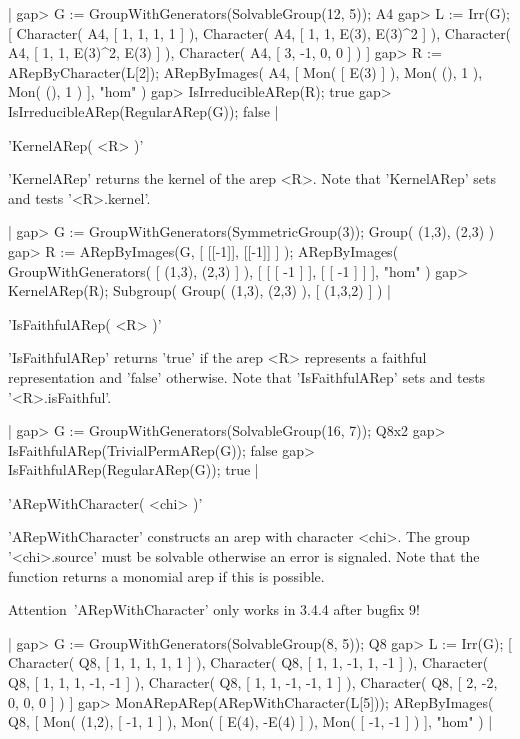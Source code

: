 |    gap> G := GroupWithGenerators(SolvableGroup(12, 5));
    A4
    gap> L := Irr(G);
    [ Character( A4, [ 1, 1, 1, 1 ] ), 
      Character( A4, [ 1, 1, E(3), E(3)^2 ] ), 
      Character( A4, [ 1, 1, E(3)^2, E(3) ] ), 
      Character( A4, [ 3, -1, 0, 0 ] ) ]
    gap> R := ARepByCharacter(L[2]);
    ARepByImages(
      A4,
      [ Mon( [ E(3) ] ),
        Mon( (), 1 ),
        Mon( (), 1 )
      ],
      "hom"
    )
    gap> IsIrreducibleARep(R);
    true 
    gap> IsIrreducibleARep(RegularARep(G));
    false |


'KernelARep( <R> )'

'KernelARep' returns the kernel of the arep <R>.
Note that 'KernelARep' sets and tests '<R>.kernel'.

|    gap> G := GroupWithGenerators(SymmetricGroup(3));
    Group( (1,3), (2,3) )
    gap> R := ARepByImages(G, [ [[-1]], [[-1]] ] );
    ARepByImages(
      GroupWithGenerators( [ (1,3), (2,3) ] ),
      [ [ [ -1 ] ],
        [ [ -1 ] ]
      ],
      "hom"
    )
    gap> KernelARep(R);
    Subgroup( Group( (1,3), (2,3) ), [ (1,3,2) ] ) |


'IsFaithfulARep( <R> )'

'IsFaithfulARep' returns 'true' if the arep <R> represents a faithful 
representation and 'false' otherwise.
Note that 'IsFaithfulARep' sets and tests '<R>.isFaithful'.

|    gap> G := GroupWithGenerators(SolvableGroup(16, 7));
    Q8x2
    gap> IsFaithfulARep(TrivialPermARep(G));
    false
    gap> IsFaithfulARep(RegularARep(G));
    true |


'ARepWithCharacter( <chi> )'

'ARepWithCharacter' constructs an arep with character <chi>. 
The group '<chi>.source' must be solvable otherwise an error is
signaled. Note that the function returns a monomial arep 
if this is possible.

Attention\:\ 'ARepWithCharacter' only works in {\GAP} 3.4.4 after
bugfix 9!

|    gap> G := GroupWithGenerators(SolvableGroup(8, 5));
    Q8
    gap> L := Irr(G);
    [ Character( Q8, [ 1, 1, 1, 1, 1 ] ), 
      Character( Q8, [ 1, 1, -1, 1, -1 ] ), 
      Character( Q8, [ 1, 1, 1, -1, -1 ] ), 
      Character( Q8, [ 1, 1, -1, -1, 1 ] ), 
      Character( Q8, [ 2, -2, 0, 0, 0 ] ) ]
    gap> MonARepARep(ARepWithCharacter(L[5]));
    ARepByImages(
      Q8,
      [ Mon(
          (1,2),
          [ -1, 1 ]
        ),
        Mon( [ E(4), -E(4) ] ),
        Mon( [ -1, -1 ] )
      ],
      "hom"
    ) |

